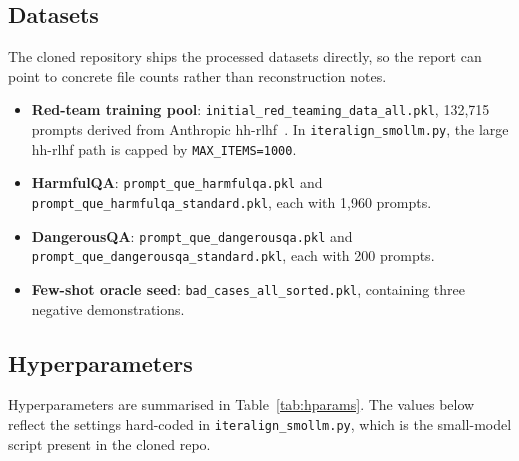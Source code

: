 \documentclass[11pt]{article}
\begin{document}
\subsection{Datasets}
The cloned repository ships the processed datasets directly, so the report can point to concrete file counts rather than reconstruction notes.
\begin{itemize}
  \item \textbf{Red-team training pool}: \texttt{initial\_red\_teaming\_data\_all.pkl}, 132{,}715 prompts derived from Anthropic hh-rlhf~\cite{ganguli2022redteam}. In \texttt{iteralign\_smollm.py}, the large hh-rlhf path is capped by \texttt{MAX\_ITEMS=1000}.
  \item \textbf{HarmfulQA}: \texttt{prompt\_que\_harmfulqa.pkl} and \texttt{prompt\_que\_harmfulqa\_standard.pkl}, each with 1{,}960 prompts.
  \item \textbf{DangerousQA}: \texttt{prompt\_que\_dangerousqa.pkl} and \texttt{prompt\_que\_dangerousqa\_standard.pkl}, each with 200 prompts.
  \item \textbf{Few-shot oracle seed}: \texttt{bad\_cases\_all\_sorted.pkl}, containing three negative demonstrations.
\end{itemize}

\subsection{Hyperparameters}
Hyperparameters are summarised in Table~\ref{tab:hparams}. The values below reflect the settings hard-coded in \texttt{iteralign\_smollm.py}, which is the small-model script present in the cloned repo.
\end{document}

